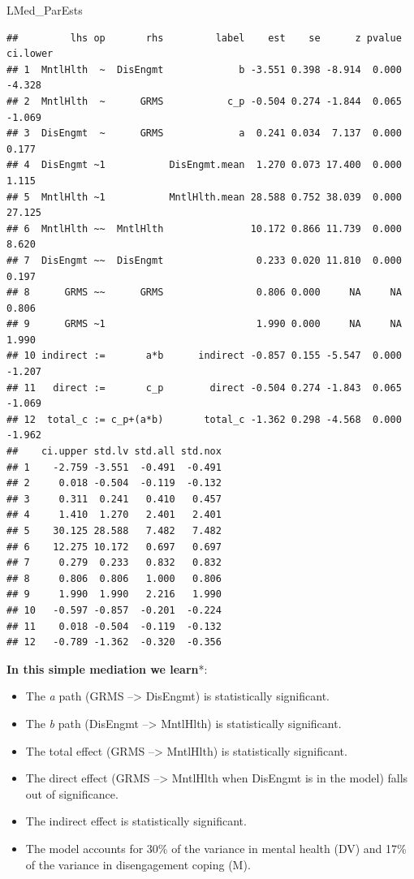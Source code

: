 \documentclass[
  english,
]{book}
\newenvironment{Shaded}{\begin{snugshade}}{\end{snugshade}}
\newcommand{\NormalTok}[1]{#1}
\providecommand{\tightlist}{%
  \setlength{\itemsep}{0pt}\setlength{\parskip}{0pt}}
\begin{document}
\begin{Shaded}
\begin{Highlighting}[]
\NormalTok{LMed\_ParEsts}
\end{Highlighting}
\end{Shaded}

\begin{verbatim}
##         lhs op       rhs         label    est    se      z pvalue ci.lower
## 1  MntlHlth  ~  DisEngmt             b -3.551 0.398 -8.914  0.000   -4.328
## 2  MntlHlth  ~      GRMS           c_p -0.504 0.274 -1.844  0.065   -1.069
## 3  DisEngmt  ~      GRMS             a  0.241 0.034  7.137  0.000    0.177
## 4  DisEngmt ~1           DisEngmt.mean  1.270 0.073 17.400  0.000    1.115
## 5  MntlHlth ~1           MntlHlth.mean 28.588 0.752 38.039  0.000   27.125
## 6  MntlHlth ~~  MntlHlth               10.172 0.866 11.739  0.000    8.620
## 7  DisEngmt ~~  DisEngmt                0.233 0.020 11.810  0.000    0.197
## 8      GRMS ~~      GRMS                0.806 0.000     NA     NA    0.806
## 9      GRMS ~1                          1.990 0.000     NA     NA    1.990
## 10 indirect :=       a*b      indirect -0.857 0.155 -5.547  0.000   -1.207
## 11   direct :=       c_p        direct -0.504 0.274 -1.843  0.065   -1.069
## 12  total_c := c_p+(a*b)       total_c -1.362 0.298 -4.568  0.000   -1.962
##    ci.upper std.lv std.all std.nox
## 1    -2.759 -3.551  -0.491  -0.491
## 2     0.018 -0.504  -0.119  -0.132
## 3     0.311  0.241   0.410   0.457
## 4     1.410  1.270   2.401   2.401
## 5    30.125 28.588   7.482   7.482
## 6    12.275 10.172   0.697   0.697
## 7     0.279  0.233   0.832   0.832
## 8     0.806  0.806   1.000   0.806
## 9     1.990  1.990   2.216   1.990
## 10   -0.597 -0.857  -0.201  -0.224
## 11    0.018 -0.504  -0.119  -0.132
## 12   -0.789 -1.362  -0.320  -0.356
\end{verbatim}

\textbf{In this simple mediation we learn}*:

\begin{itemize}
\tightlist
\item
  The \emph{a} path (GRMS --\textgreater{} DisEngmt) is statistically significant.
\item
  The \emph{b} path (DisEngmt --\textgreater{} MntlHlth) is statistically significant.
\item
  The total effect (GRMS --\textgreater{} MntlHlth) is statistically significant.
\item
  The direct effect (GRMS --\textgreater{} MntlHlth when DisEngmt is in the model) falls out of significance.
\item
  The indirect effect is statistically significant.
\item
  The model accounts for 30\% of the variance in mental health (DV) and 17\% of the variance in disengagement coping (M).
\end{itemize}
\end{document}
